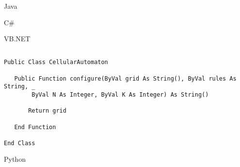 Java

\begin{Shaded}
\begin{Highlighting}[]

 

    \NormalTok{[] }\NormalTok{(}


\NormalTok{   \}}

\NormalTok{\}}
\end{Highlighting}
\end{Shaded}

C\#

\begin{Shaded}
\begin{Highlighting}[]


 

    \NormalTok{[] }\NormalTok{(}
\NormalTok{   \}}

\NormalTok{\}}
\end{Highlighting}
\end{Shaded}

VB.NET

\begin{verbatim}

Public Class CellularAutomaton

   Public Function configure(ByVal grid As String(), ByVal rules As String, _
        ByVal N As Integer, ByVal K As Integer) As String()

       Return grid

   End Function

End Class
\end{verbatim}

Python

\begin{Shaded}
\begin{Highlighting}[]



\end{Highlighting}
\end{Shaded}

